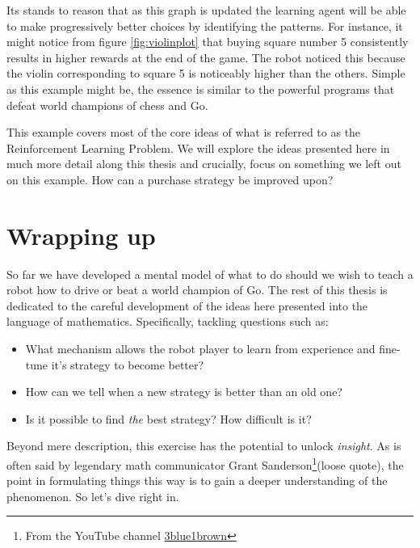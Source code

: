 Its stands to reason that as this graph is updated the learning 
agent will be able to make progressively better choices by 
identifying the patterns. For instance, it might notice from 
figure \ref{fig:violinplot} that buying square number 5 
consistently results in higher rewards at the end of the game. 
The robot noticed this because the violin corresponding to 
square 5 is noticeably higher than the others. Simple as this 
example might be, the essence is similar to the powerful 
programs that defeat world champions of chess and Go.

This example covers most of the core ideas of what is referred 
to as the Reinforcement Learning Problem. We will explore the 
ideas presented here in much more detail along this thesis and 
crucially, focus on something we left out on this example. How 
can a purchase strategy be improved upon?

\section{Wrapping up}
So far we have developed a mental model of what to do should we 
wish to teach a robot how to drive or beat a world champion of 
Go. The rest of this thesis is dedicated to the careful 
development of the ideas here presented into the language of 
mathematics. Specifically, tackling questions such as:
\begin{itemize}
	\item What mechanism allows the robot player to learn from 
	experience and fine-tune it's strategy to become better?
	\item How can we tell when a new strategy is better than an 
	old one?
	\item Is it possible to find \textit{the} best strategy? 
	How difficult is it?
\end{itemize}

Beyond mere description, this exercise has the potential to 
unlock \textit{insight}. As is often said by legendary math 
communicator Grant Sanderson\footnote{From the YouTube channel 
\href{https://www.youtube.com/channel/UCYO_jab_esuFRV4b17AJtAw}{3blue1brown}}(loose 
quote), the point in formulating things this way is to gain a 
deeper understanding of the phenomenon. So let's dive right in.
